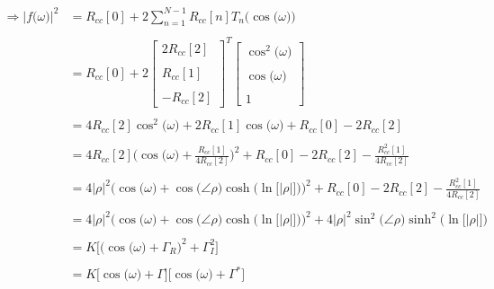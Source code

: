 \documentclass{article}
\begin{document}
\begin{align*}
    \Rightarrow \Big|f\big(\omega\big)\Big|^{2}&= R_{cc}[0] + 2\sum_{n = 1}^{N - 1}R_{cc}[n]T_{n}\Big(\cos\big(\omega\big)\Big) \\ \\
                                               &= R_{cc}[0] + 2\begin{bmatrix}
                                                                   2R_{cc}[2] \\ \\
                                                                    R_{cc}[1] \\ \\
                                                                   -R_{cc}[2]
                                                                 \end{bmatrix}^{T}
                                                               \begin{bmatrix}
                                                                   \cos^{2}\big(\omega\big) \\ \\
                                                                       \cos\big(\omega\big) \\ \\
                                                                                          1
                                                                 \end{bmatrix} \\ \\
                                               &= 4R_{cc}[2]\cos^{2}\big(\omega\big) + 2R_{cc}[1]\cos\big(\omega\big) + R_{cc}[0] - 2R_{cc}[2] \\ \\
                                               &= 4R_{cc}[2]\Bigg(\cos\big(\omega\big) + \frac{R_{cc}[1]}{4R_{cc}[2]}\Bigg)^{2} + R_{cc}[0] - 2R_{cc}[2] - \frac{R_{cc}^{2}[1]}{4R_{cc}[2]} \\ \\
                                               &= 4\big|\rho\big|^{2}\Bigg(\cos\big(\omega\big) + \cos\big(\angle{\rho}\big)\cosh\Big(\ln\big[\big|\rho\big|\big]\Big)\Bigg)^{2} + R_{cc}[0] - 2R_{cc}[2] - \frac{R_{cc}^{2}[1]}{4R_{cc}[2]} \\ \\
                                               &= 4\big|\rho\big|^{2}\Bigg(\cos\big(\omega\big) + \cos\big(\angle{\rho}\big)\cosh\Big(\ln\big[\big|\rho\big|\big]\Big)\Bigg)^{2} + 4\big|\rho\big|^{2}\sin^{2}\big(\angle{\rho}\big)\sinh^{2}\Big(\ln\big[\big|\rho\big|\big]\Big) \\ \\
                                               &= K\bigg[\Big(\cos\big(\omega\big) + \Gamma_{R}\Big)^{2} + \Gamma_{I}^{2}\bigg] \\ \\
                                               &= K\Big[\cos\big(\omega\big) + \Gamma\Big]\Big[\cos\big(\omega\big) + \Gamma^{*}\Big]
  \end{align*}
\end{document}

